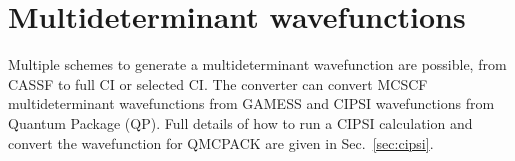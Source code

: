 \section{Multideterminant wavefunctions}
\label{sec:multideterminants}
Multiple schemes to generate a multideterminant wavefunction are
possible, from CASSF to full CI or selected CI. The \qmcpack converter can
convert MCSCF multideterminant wavefunctions from
GAMESS\cite{schmidt93} and CIPSI\cite{Caffarel2013} wavefunctions from
Quantum Package\cite{QP} (QP). Full details of how to run a CIPSI
calculation and convert the wavefunction for QMCPACK are given in 
Sec.~\ref{sec:cipsi}.

